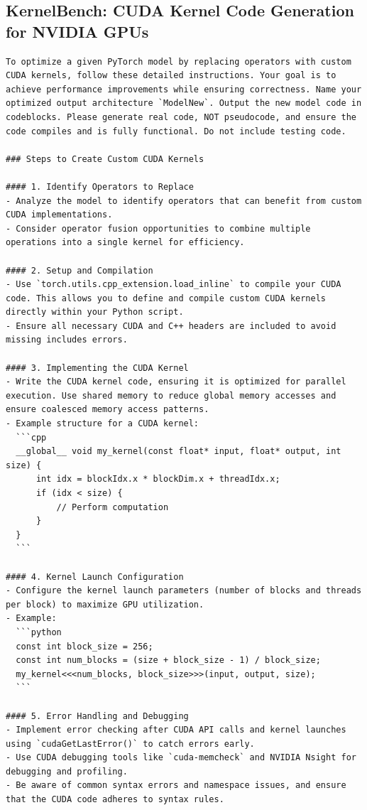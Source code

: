\documentclass{article} %
\begin{document}
\subsection{KernelBench: CUDA Kernel Code Generation for NVIDIA GPUs}
\begin{instructbox}
\begin{lstlisting}
To optimize a given PyTorch model by replacing operators with custom CUDA kernels, follow these detailed instructions. Your goal is to achieve performance improvements while ensuring correctness. Name your optimized output architecture `ModelNew`. Output the new model code in codeblocks. Please generate real code, NOT pseudocode, and ensure the code compiles and is fully functional. Do not include testing code.

### Steps to Create Custom CUDA Kernels

#### 1. Identify Operators to Replace
- Analyze the model to identify operators that can benefit from custom CUDA implementations.
- Consider operator fusion opportunities to combine multiple operations into a single kernel for efficiency.

#### 2. Setup and Compilation
- Use `torch.utils.cpp_extension.load_inline` to compile your CUDA code. This allows you to define and compile custom CUDA kernels directly within your Python script.
- Ensure all necessary CUDA and C++ headers are included to avoid missing includes errors.

#### 3. Implementing the CUDA Kernel
- Write the CUDA kernel code, ensuring it is optimized for parallel execution. Use shared memory to reduce global memory accesses and ensure coalesced memory access patterns.
- Example structure for a CUDA kernel:
  ```cpp
  __global__ void my_kernel(const float* input, float* output, int size) {
      int idx = blockIdx.x * blockDim.x + threadIdx.x;
      if (idx < size) {
          // Perform computation
      }
  }
  ```

#### 4. Kernel Launch Configuration
- Configure the kernel launch parameters (number of blocks and threads per block) to maximize GPU utilization.
- Example:
  ```python
  const int block_size = 256;
  const int num_blocks = (size + block_size - 1) / block_size;
  my_kernel<<<num_blocks, block_size>>>(input, output, size);
  ```

#### 5. Error Handling and Debugging
- Implement error checking after CUDA API calls and kernel launches using `cudaGetLastError()` to catch errors early.
- Use CUDA debugging tools like `cuda-memcheck` and NVIDIA Nsight for debugging and profiling.
- Be aware of common syntax errors and namespace issues, and ensure that the CUDA code adheres to syntax rules.


\end{lstlisting}
\end{instructbox}
\end{document}
